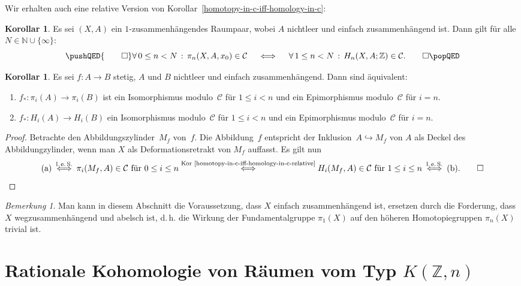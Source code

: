 \documentclass[11pt, a4paper, german]{article}
\theoremstyle{definition}
\newtheorem{kor}[lem]{Korollar}
\theoremstyle{remark}
\newtheorem*{bem}{Bemerkung}
\newcommand{\N}{\mathbb{N}} %
\newcommand{\Z}{\mathbb{Z}} %
\newcommand{\fa}[1]{\forall \, {#1} \,:\,}
\newcommand{\SC}{\mathcal{C}} %
\renewcommand{\dh}{d.\,h.} %
\begin{document}
Wir erhalten auch eine relative Version von Korollar~\ref{homotopy-in-c-iff-homology-in-c}:

\begin{kor}\label{homotopy-in-c-iff-homology-in-c-relative}
  Es sei $(X, A)$ ein $1$-zusammenhängendes Raumpaar, wobei $A$ nichtleer und einfach zusammenhängend ist.
  Dann gilt für alle $N \in \N \cup \{ \infty \}$:
  \[
    \pushQED{\qed} 
    \fa{0 \leq n < N} \pi_n(X, A, x_0) \in \SC
    \quad \iff \quad
    \fa{1 \leq n < N} H_n(X, A; \Z) \in \SC.
    \qedhere
    \popQED
  \]
\end{kor}

\begin{kor}\label{homotopy-homology-equivalence-mod-c}
  Es sei $f : A \to B$ stetig, $A$ und $B$ nichtleer und einfach zusammenhängend.
  Dann sind äquivalent:
  \begin{enumerate}[label=(\alph*)]
    \item $f_* : \pi_i(A) \to \pi_i(B)$ ist ein Isomorphismus modulo~$\SC$ für $1 \leq i < n$ und ein Epimorphismus modulo~$\SC$ für $i = n$.
    \item $f_* : H_i(A) \to H_i(B)$ ein Isomorphismus modulo~$\SC$ für $1 \leq i < n$ und ein Epimorphismus modulo~$\SC$ für $i = n$.
  \end{enumerate}
\end{kor}

\begin{proof}
  Betrachte den Abbildungszylinder~$M_f$ von~$f$.
  Die Abbildung~$f$ entspricht der Inklusion~$A \hookrightarrow M_f$ von $A$ als Deckel des Abbildungzylinder, wenn man $X$ als Deformationsretrakt von $M_f$ auffasst.
  Es gilt nun
  \[
    \text{(a)}
    \stackrel{\text{l.\,e.\,S.}}{\iff}
    \pi_i(M_f, A) \in \SC \text{ für } 0 \leq i \leq n
    \stackrel{\text{Kor \ref{homotopy-in-c-iff-homology-in-c-relative}}}{\iff}
    H_i(M_f, A) \in \SC \text{ für } 1 \leq i \leq n
    \stackrel{\text{l.\,e.\,S.}}{\iff}
    \text{(b)}.
    \qedhere
  \]
\end{proof}

\begin{bem}
  Man kann in diesem Abschnitt die Voraussetzung, dass $X$ einfach zusammenhängend ist, ersetzen durch die Forderung, dass $X$ wegzusammenhängend und abelsch ist, \dh{} die Wirkung der Fundamentalgruppe $\pi_1(X)$ auf den höheren Homotopiegruppen $\pi_n(X)$ trivial ist.
\end{bem}

\section{Rationale Kohomologie von Räumen vom Typ $K(\Z, n)$}
\label{sec:rational-cohomology}
\end{document}
